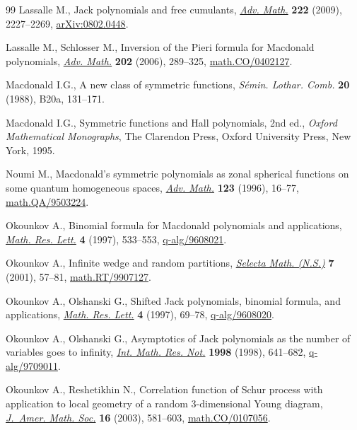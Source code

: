 \documentclass[pdftex]{sigma}
\numberwithin{equation}{section}
\begin{document}
\begin{thebibliography}{99}
Lassalle M., Jack polynomials and free cumulants, \href{https://doi.org/10.1016/j.aim.2009.07.007}{\textit{Adv. Math.}}
 \textbf{222} (2009), 2227--2269, \href{https://arxiv.org/abs/0802.0448}{arXiv:0802.0448}.

Lassalle M., Schlosser M., Inversion of the {P}ieri formula for {M}acdonald
 polynomials, \href{https://doi.org/10.1016/j.aim.2005.03.009}{\textit{Adv. Math.}} \textbf{202} (2006), 289--325,
 \href{https://arxiv.org/abs/math.CO/0402127}{math.CO/0402127}.

Macdonald I.G., A new class of symmetric functions, \textit{S\'emin. Lothar.
 Comb.} \textbf{20} (1988), B20a, 131--171.

Macdonald I.G., Symmetric functions and {H}all polynomials, 2nd ed., \textit{Oxford
 Mathematical Monographs}, The Clarendon Press, Oxford University Press, New
 York, 1995.

Noumi M., Macdonald's symmetric polynomials as zonal spherical functions on
 some quantum homogeneous spaces, \href{https://doi.org/10.1006/aima.1996.0066}{\textit{Adv. Math.}} \textbf{123} (1996),
 16--77, \href{https://arxiv.org/abs/math.QA/9503224}{math.QA/9503224}.

Okounkov A., Binomial formula for {M}acdonald polynomials and applications,
 \href{https://doi.org/10.4310/MRL.1997.v4.n4.a10}{\textit{Math. Res. Lett.}} \textbf{4} (1997), 533--553,
 \href{https://arxiv.org/abs/q-alg/9608021}{q-alg/9608021}.

Okounkov A., Inf\/inite wedge and random partitions, \href{https://doi.org/10.1007/PL00001398}{\textit{Selecta Math.
 (N.S.)}} \textbf{7} (2001), 57--81, \href{https://arxiv.org/abs/math.RT/9907127}{math.RT/9907127}.

Okounkov A., Olshanski G., Shifted {J}ack polynomials, binomial formula, and
 applications, \href{https://doi.org/10.4310/MRL.1997.v4.n1.a7}{\textit{Math. Res. Lett.}} \textbf{4} (1997), 69--78,
 \href{https://arxiv.org/abs/q-alg/9608020}{q-alg/9608020}.

Okounkov A., Olshanski G., Asymptotics of {J}ack polynomials as the number of
 variables goes to inf\/inity, \href{https://doi.org/10.1155/S1073792898000403}{\textit{Int. Math. Res. Not.}} \textbf{1998}
 (1998), 641--682, \href{https://arxiv.org/abs/q-alg/9709011}{q-alg/9709011}.

Okounkov A., Reshetikhin N., Correlation function of {S}chur process with
 application to local geometry of a random 3-dimensional {Y}oung diagram,
 \href{https://doi.org/10.1090/S0894-0347-03-00425-9}{\textit{J.~Amer. Math. Soc.}} \textbf{16} (2003), 581--603,
 \href{https://arxiv.org/abs/math.CO/0107056}{math.CO/0107056}.


\end{thebibliography}
\end{document}
